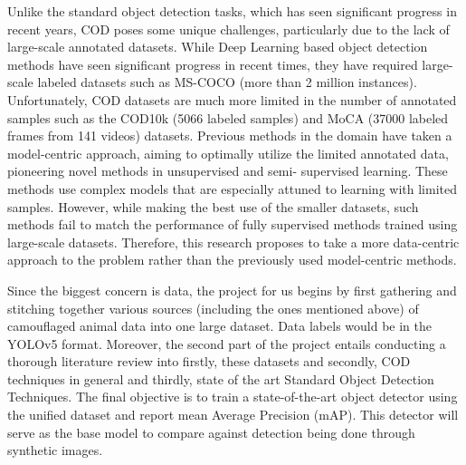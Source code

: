 \documentclass[conference]{IEEEtran}
\begin{document}
Unlike the standard object detection tasks, which has seen significant progress 
in recent years, COD poses some unique challenges, particularly due to the lack of large-scale 
annotated datasets. While Deep Learning based object detection methods have seen significant 
progress in recent times, they have required large-scale labeled datasets such as MS-COCO \cite{coco}
(more than 2 million instances). Unfortunately, COD datasets are much more limited in the 
number of annotated samples such as the COD10k (5066 labeled samples) \cite{ConcealedFan} and MoCA 
(37000 labeled frames from 141 videos) \cite{Lamdouar_2020_ACCV} datasets.
Previous methods in the domain have taken a model-centric approach, aiming to 
optimally utilize the limited annotated data, pioneering novel methods in unsupervised and semi-
supervised learning. These methods use complex models that are especially attuned to learning 
with limited samples. However, while making the best use of the smaller datasets, such 
methods fail to match the performance of fully supervised methods trained using large-scale 
datasets. Therefore, this research proposes to take a more data-centric approach to the 
problem rather than the previously used model-centric methods.

Since the biggest concern is data, the project for us begins by first gathering and stitching together various sources (including the ones mentioned above) of camouflaged animal data into one large dataset. Data labels would be in the YOLOv5 format. Moreover, the second part of the project entails conducting a thorough literature review into firstly, these datasets and secondly, COD techniques in general and thirdly, state of the art Standard Object Detection Techniques. The final objective is to train a state-of-the-art object detector using the unified dataset and report mean Average Precision (mAP). This detector will serve as the base model to compare against detection being done through synthetic images.


\end{document}
